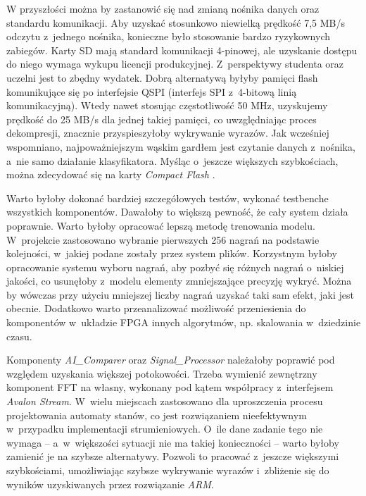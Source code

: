 W przyszłości można by zastanowić się nad zmianą nośnika danych oraz standardu komunikacji. Aby uzyskać stosunkowo niewielką prędkość 7,5 MB/s odczytu z~jednego nośnika, konieczne było stosowanie bardzo ryzykownych zabiegów. Karty SD mają standard komunikacji 4-pinowej, ale uzyskanie dostępu do niego wymaga wykupu licencji produkcyjnej. Z~perspektywy studenta oraz uczelni jest to zbędny wydatek. Dobrą alternatywą byłyby pamięci flash komunikujące się po interfejsie QSPI (interfejs SPI z~4-bitową linią komunikacyjną). Wtedy nawet stosując częstotliwość 50 MHz, uzyskujemy prędkość do 25 MB/s dla jednej takiej pamięci, co uwzględniając proces dekompresji, znacznie przyspieszyłoby wykrywanie wyrazów. Jak wcześniej wspomniano, najpoważniejszym wąskim gardłem jest czytanie danych z~nośnika, a~nie samo działanie klasyfikatora. Myśląc o~jeszcze większych szybkościach, można zdecydować się na karty \textit{Compact Flash} \cite{CF}.

Warto byłoby dokonać bardziej szczegółowych testów, wykonać testbenche wszystkich komponentów. Dawałoby to większą pewność, że cały system działa poprawnie. Warto byłoby opracować lepszą metodę trenowania modelu. W~projekcie zastosowano wybranie pierwszych 256 nagrań na podstawie kolejności, w~jakiej podane zostały przez system plików. Korzystnym byłoby opracowanie systemu wyboru nagrań, aby pozbyć się różnych nagrań o~niskiej jakości, co usunęłoby z~modelu elementy zmniejszające precyzję wykryć. Można by wówczas przy użyciu mniejszej liczby nagrań uzyskać taki sam efekt, jaki jest obecnie. Dodatkowo warto przeanalizować możliwość przeniesienia do komponentów w~układzie FPGA innych algorytmów, np. skalowania w~dziedzinie czasu.

Komponenty \textit{AI\_Comparer} oraz \textit{Signal\_Processor} należałoby poprawić pod względem uzyskania większej potokowości. Trzeba wymienić zewnętrzny komponent FFT na własny, wykonany pod kątem współpracy z~interfejsem \textit{Avalon Stream}. W~wielu miejscach zastosowano dla uproszczenia procesu projektowania automaty stanów, co jest rozwiązaniem nieefektywnym w~przypadku implementacji strumieniowych. O~ile dane zadanie tego nie wymaga – a~w~większości sytuacji nie ma takiej konieczności – warto byłoby zamienić je na szybsze alternatywy. Pozwoli to pracować z~jeszcze większymi szybkościami, umożliwiając szybsze wykrywanie wyrazów i~zbliżenie się do wyników uzyskiwanych przez rozwiązanie \textit{ARM}.